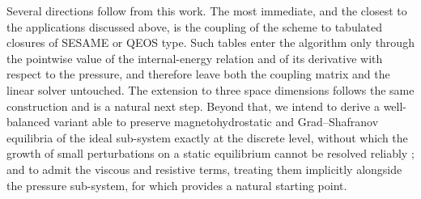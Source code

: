 \documentclass[a4paper,fleqn]{cas-sc}
\newtheorem{theorem}{Theorem}
\newtheorem{lemma}{Lemma}
\theoremstyle{definition}
\theoremstyle{remark}
\begin{document}
Several directions follow from this work. The most immediate, and the closest to the
applications discussed above, is the coupling of the scheme to tabulated closures of
SESAME \cite{SESAME} or QEOS \cite{QEOS} type. Such tables enter the algorithm only through the pointwise value of
the internal-energy relation and of its derivative with respect to the pressure, and
therefore leave both the coupling matrix and the linear solver untouched. The extension to three space dimensions follows the same construction
and is a natural next step. Beyond that, we intend to derive a well-balanced variant able to preserve
magnetohydrostatic and Grad--Shafranov equilibria of the ideal sub-system exactly at the
discrete level, without which the growth of small perturbations on a static equilibrium
cannot be resolved reliably \cite{BoscheriWB,FAMBRIWB}; and to admit the viscous and
resistive terms, treating them implicitly alongside the pressure sub-system, for which
\cite{Dematte2024} provides a natural starting point.

















\printcredits






\end{document}

